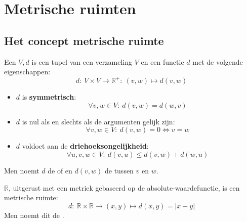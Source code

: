 \documentclass[main.tex]{subfiles}
\begin{document}
\section{Metrische ruimten}
\label{sec:metrische-ruimten}

\subsection{Het concept metrische ruimte}
\label{sec:het-conc-metr}

\begin{de}
  Een  $V,d$ is een tupel van een verzameling $V$ en een functie $d$ met de volgende eigenschappen:
  \[ d:\ V \times V \rightarrow \mathbb{R}^{+}:\ (v,w) \mapsto d(v,w) \]
  \begin{itemize}
  \item $d$ is \textbf{symmetrisch}:
    \[ \forall v,w \in V:\ d(v,w) = d(w,v) \]
  \item $d$ is nul als en slechts als de argumenten gelijk zijn:
    \[ \forall v,w \in V:\ d(v,w) = 0 \Leftrightarrow v = w \]
  \item $d$ voldoet aan de \textbf{driehoeksongelijkheid}:
    \[ \forall u,v,w \in V:\ d(v,u) \le d(v,w) + d(w,u) \]
  \end{itemize}
  Men noemt $d$ de  of  en $d(v,w)$ de  tussen $v$ en $w$.
\end{de}

\begin{vb}
  $\mathbb{R}$, uitgerust met een metriek gebaseerd op de absolute-waardefunctie, is een metrische ruimte:
  \[ d:\ \mathbb{R}\times\mathbb{R}\rightarrow (x,y) \mapsto d(x,y)=|x-y| \]
  Men noemt dit de .
\end{vb}
\end{document}
